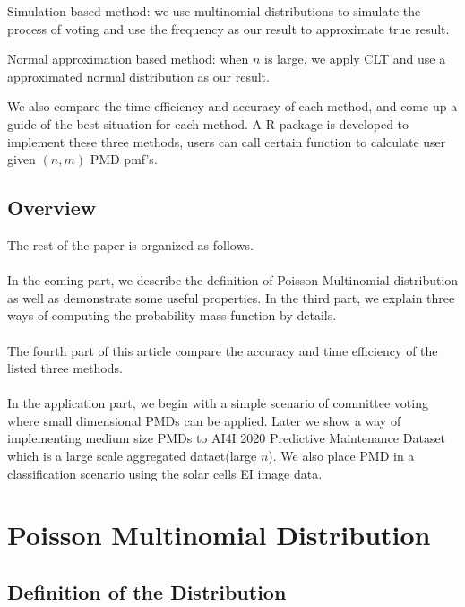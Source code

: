 \documentclass[12pt]{article}
\begin{document}
Simulation based method: we use multinomial distributions to simulate the process of voting and use the frequency as our result to approximate true result.

Normal approximation based method: when $n$ is large, we apply CLT and use a approximated normal distribution as our result.


We also compare the time efficiency and accuracy of each method, and come up a guide of the best situation for each method. A R package is developed to implement these three methods, users can call certain function to calculate user given $(n,m)$ PMD pmf's.




\subsection{Overview}
The rest of the paper is organized as follows. \\
\\
In the coming part, we describe the definition of Poisson Multinomial distribution as well as demonstrate some useful properties. In the third part, we explain three ways of computing the probability mass function by details.\\
\\
The fourth part of this article compare the accuracy and time efficiency of the listed three methods. \\
\\
In the application part, we begin with a simple scenario of committee voting where small dimensional PMDs can be applied. Later we show a way of implementing medium size PMDs to AI4I 2020 Predictive Maintenance Dataset which is a large scale aggregated dataet(large $n$). We also place PMD in a classification scenario using the solar cells EI image data.



\section{Poisson Multinomial Distribution}
\subsection{Definition of the Distribution}
		
\end{document}
